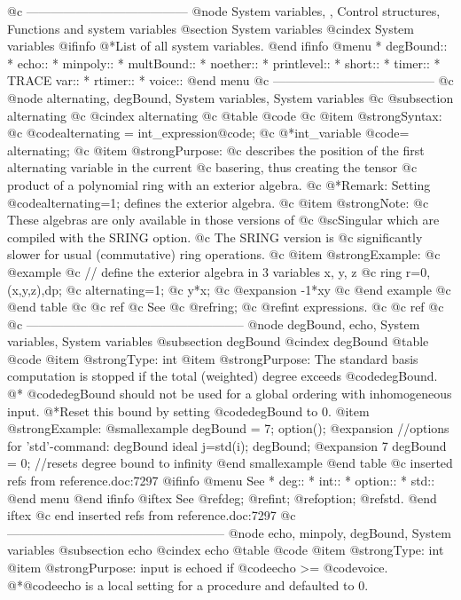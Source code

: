 {{{{{{{{@c ---------------------------------------
@node System variables,  , Control structures, Functions and system variables
@section System variables
@cindex System variables
@ifinfo
@*List of all system variables.
@end ifinfo
@menu
* degBound::
* echo::
* minpoly::
* multBound::
* noether::
* printlevel::
* short::
* timer::
* TRACE var::
* rtimer::
* voice::
@end menu
@c ---------------------------------------
@c @node alternating, degBound, System variables, System variables
@c @subsection alternating
@c @cindex alternating
@c @table @code
@c @item @strong{Syntax:}
@c @code{alternating =} int_expression@code{;}
@c @*int_variable @code{= alternating;}
@c @item @strong{Purpose:}
@c describes the position of the first alternating variable in the current
@c basering, thus creating the tensor
@c product of a polynomial ring with an exterior algebra.
@c @*Remark: Setting @code{alternating=1;} defines the exterior algebra.
@c @item @strong{Note:}
@c These algebras are only available in those versions of
@c @sc{Singular} which are compiled with the SRING option.
@c The SRING version is
@c significantly slower for usual (commutative) ring operations.
@c @item @strong{Example:}
@c @example
@c   // define the exterior algebra in 3 variables x, y, z
@c   ring r=0,(x,y,z),dp;
@c   alternating=1;
@c   y*x;
@c   @expansion{} -1*xy
@c @end example
@c @end table
@c @c ref
@c See
@c @ref{ring};
@c @ref{int expressions}.
@c @c ref
@c @c -----------------------------------------------------
@node degBound, echo, System variables, System variables
@subsection degBound
@cindex degBound
@table @code
@item @strong{Type:}
int
@item @strong{Purpose:}
The standard basis computation is stopped if the total
(weighted) degree
exceeds @code{degBound}.
@* @code{degBound} should not be used for a global ordering with inhomogeneous
input.
@*Reset this bound by setting @code{degBound} to 0.
@item @strong{Example:}
@smallexample
degBound = 7;
option();
@expansion{} //options for 'std'-command: degBound
ideal j=std(i);
degBound;
@expansion{} 7
degBound = 0; //resets degree bound to infinity
@end smallexample
@end table
@c inserted refs from reference.doc:7297
@ifinfo
@menu
See
* deg::
* int::
* option::
* std::
@end menu
@end ifinfo
@iftex
See
@ref{deg};
@ref{int};
@ref{option};
@ref{std}.
@end iftex
@c end inserted refs from reference.doc:7297
@c -----------------------------------------------------
@node echo, minpoly, degBound, System variables
@subsection echo
@cindex echo
@table @code
@item @strong{Type:}
int
@item @strong{Purpose:}
input is echoed if @code{echo} >= @code{voice}.
@*@code{echo} is a local setting for a procedure and defaulted to 0.
}}}}}}}}
